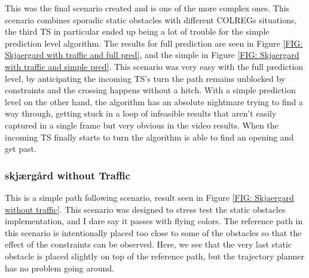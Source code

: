 This was the final scenario created and is one of the more complex ones. This scenario combines sporadic static obstacles with different COLREGs situations, the third
TS in particular ended up being a lot of trouble for the simple prediction level algorithm. The results for full prediction are seen in Figure \ref{FIG: Skjaergard with traffic and full pred},
and the simple in Figure \ref{FIG: Skjaergard with traffic and simple pred}. This scenario was very easy with the full prediction level, by anticipating the incoming TS's turn the path
remains unblocked by constraints and the crossing happens without a hitch. With a simple prediction level on the other hand, the algorithm has an absolute nightmare trying to find a way through,
getting stuck in a loop of infeasible results that aren't easily captured in a single frame but very obvious in the video results. When the incoming TS finally starts to turn the algorithm
is able to find an opening and get past.


\subsubsection{skjærgård without Traffic}
This is a simple path following scenario, result seen in Figure \ref{FIG: Skjaergard without traffic}. This scenario was designed to stress
test the static obstacles implementation, and I dare say it passes with flying colors. The reference path in this scenario is intentionally placed
too close to some of the obstacles so that the effect of the constraints can be observed. Here, we see that the very last static obstacle is placed
slightly on top of the reference path, but the trajectory planner has no problem going around.

